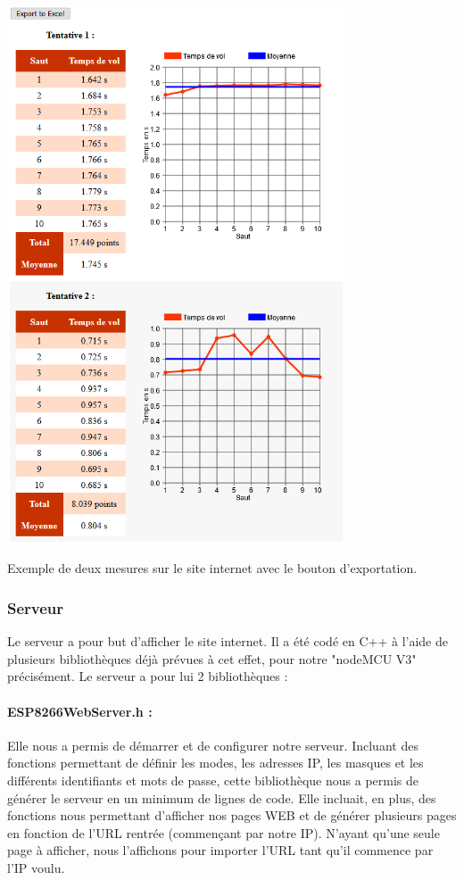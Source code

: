 \begin{center}
  \includegraphics[width=10cm]{photoAlex/siteWEB}
  
  Exemple de deux mesures sur le site internet avec le bouton d'exportation.
\end{center}

\subsubsection{Serveur}
Le serveur a pour but d'afficher le site internet. Il a été codé en C++ à l'aide de plusieurs bibliothèques déjà prévues à cet effet, pour notre "nodeMCU V3" précisément. Le serveur a pour lui 2 bibliothèques : 
\paragraph{ESP8266WebServer.h :}
Elle nous a permis de démarrer et de configurer notre serveur. Incluant des fonctions permettant de définir les modes, les adresses IP, les masques et les différents identifiants et mots de passe, cette bibliothèque nous a permis de générer le serveur en un minimum de lignes de code.
Elle incluait, en plus, des fonctions nous permettant d'afficher nos pages WEB et de générer plusieurs pages en fonction de l'URL rentrée (commençant par notre IP). N'ayant qu'une seule page à afficher, nous l'affichons pour importer l'URL tant qu'il commence par l'IP voulu.
